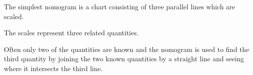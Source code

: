 The simplest nomogram is a chart consisting of three parallel lines which are 
scaled.  
\par
The scales represent three related quantities. 
\par
Often only two of the quantities are known and the nomogram is used to find 
the third quantity by joining the two known quantities by a straight line and 
seeing where it intersects the third line.